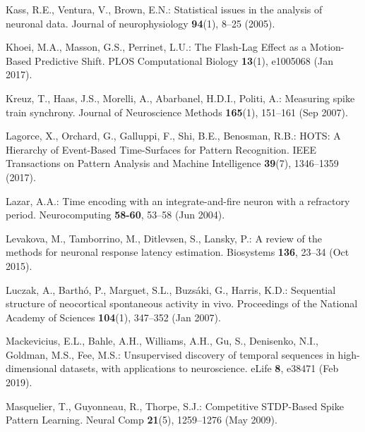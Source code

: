 \documentclass[runningheads]{llncs}
\begin{document}
{\begin{thebibliography}{10}
Kass, R.E., Ventura, V., Brown, E.N.: Statistical issues in the analysis of
  neuronal data. Journal of neurophysiology  \textbf{94}(1),  8--25 (2005).

Khoei, M.A., Masson, G.S., Perrinet, L.U.: The {Flash}-{Lag} {Effect} as a
  {Motion}-{Based} {Predictive} {Shift}. PLOS Computational Biology
  \textbf{13}(1),  e1005068 (Jan 2017). %
  
Kreuz, T., Haas, J.S., Morelli, A., Abarbanel, H.D.I., Politi, A.: Measuring
  spike train synchrony. Journal of Neuroscience Methods  \textbf{165}(1),
  151--161 (Sep 2007). %

Lagorce, X., Orchard, G., Galluppi, F., Shi, B.E., Benosman, R.B.: {HOTS}: {A}
  {Hierarchy} of {Event}-{Based} {Time}-{Surfaces} for {Pattern} {Recognition}.
  IEEE Transactions on Pattern Analysis and Machine Intelligence
  \textbf{39}(7),  1346--1359 (2017). %

Lazar, A.A.: Time encoding with an integrate-and-fire neuron with a refractory
  period. Neurocomputing  \textbf{58-60},  53--58 (Jun 2004).

Levakova, M., Tamborrino, M., Ditlevsen, S., Lansky, P.: A review of the
  methods for neuronal response latency estimation. Biosystems  \textbf{136},
  23--34 (Oct 2015). %

Luczak, A., Barthó, P., Marguet, S.L., Buzsáki, G., Harris, K.D.: Sequential
  structure of neocortical spontaneous activity in vivo. Proceedings of the
  National Academy of Sciences  \textbf{104}(1),  347--352 (Jan 2007).

Mackevicius, E.L., Bahle, A.H., Williams, A.H., Gu, S., Denisenko, N.I.,
  Goldman, M.S., Fee, M.S.: Unsupervised discovery of temporal sequences in
  high-dimensional datasets, with applications to neuroscience. eLife
  \textbf{8},  e38471 (Feb 2019). %

Masquelier, T., Guyonneau, R., Thorpe, S.J.: Competitive {STDP}-{Based} {Spike}
  {Pattern} {Learning}. Neural Comp  \textbf{21}(5),  1259--1276 (May
  2009). %


\end{thebibliography}}
\end{document}
